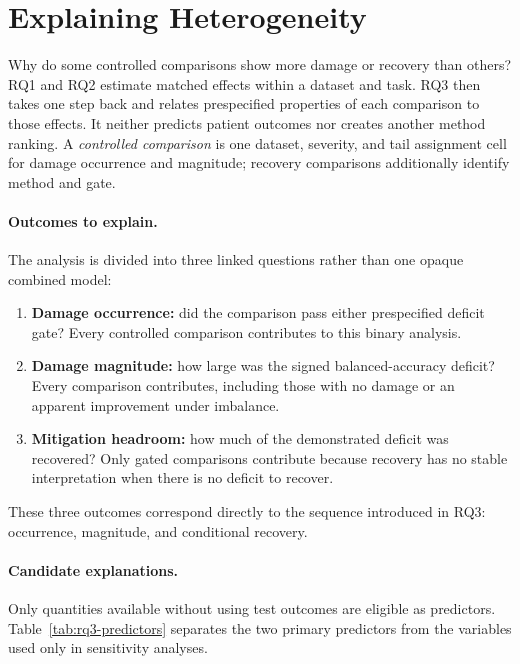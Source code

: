 \documentclass[11pt]{article}
\begin{document}
\section{Explaining Heterogeneity}
\label{sec:rq3}
Why do some controlled comparisons show more damage or recovery than others? RQ1 and RQ2 estimate matched effects within a dataset and task. RQ3 then takes one step back and relates prespecified properties of each comparison to those effects. It neither predicts patient outcomes nor creates another method ranking. A \emph{controlled comparison} is one dataset, severity, and tail assignment cell for damage occurrence and magnitude; recovery comparisons additionally identify method and gate.

\paragraph{Outcomes to explain.}
The analysis is divided into three linked questions rather than one opaque combined model:
\begin{enumerate}
  \item \textbf{Damage occurrence:} did the comparison pass either prespecified deficit gate? Every controlled comparison contributes to this binary analysis.
  \item \textbf{Damage magnitude:} how large was the signed balanced-accuracy deficit? Every comparison contributes, including those with no damage or an apparent improvement under imbalance.
  \item \textbf{Mitigation headroom:} how much of the demonstrated deficit was recovered? Only gated comparisons contribute because recovery has no stable interpretation when there is no deficit to recover.
\end{enumerate}

\noindent These three outcomes correspond directly to the sequence introduced in RQ3: occurrence, magnitude, and conditional recovery.

\paragraph{Candidate explanations.}
Only quantities available without using test outcomes are eligible as predictors. Table~\ref{tab:rq3-predictors} separates the two primary predictors from the variables used only in sensitivity analyses.
\end{document}
